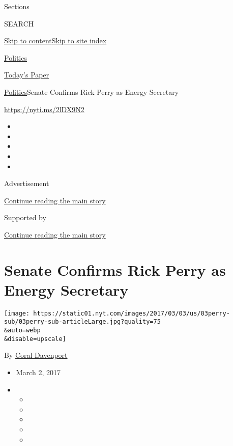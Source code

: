 Sections

SEARCH

\protect\hyperlink{site-content}{Skip to
content}\protect\hyperlink{site-index}{Skip to site index}

\href{https://www.nytimes.com/section/politics}{Politics}

\href{https://myaccount.nytimes.com/auth/login?response_type=cookie\&client_id=vi}{}

\href{https://www.nytimes.com/section/todayspaper}{Today's Paper}

\href{/section/politics}{Politics}\textbar{}Senate Confirms Rick Perry
as Energy Secretary

\url{https://nyti.ms/2lDX9N2}

\begin{itemize}
\item
\item
\item
\item
\item
\end{itemize}

Advertisement

\protect\hyperlink{after-top}{Continue reading the main story}

Supported by

\protect\hyperlink{after-sponsor}{Continue reading the main story}

\hypertarget{senate-confirms-rick-perry-as-energy-secretary}{%
\section{Senate Confirms Rick Perry as Energy
Secretary}\label{senate-confirms-rick-perry-as-energy-secretary}}

\texttt{[image: https://static01.nyt.com/images/2017/03/03/us/03perry-sub/03perry-sub-articleLarge.jpg?quality=75\\\&auto=webp\\\&disable=upscale]}

By \href{https://www.nytimes.com/by/coral-davenport}{Coral Davenport}

\begin{itemize}
\item
  March 2, 2017
\item
  \begin{itemize}
  \item
  \item
  \item
  \item
  \item
  \end{itemize}
\end{itemize}

